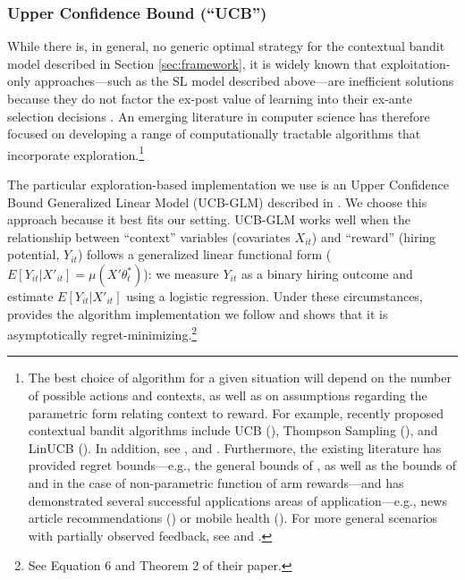 \documentclass[crop,noquery,editorname,historyrev,nosurname,runningno,sepcount]{RESTUD}
\begin{document}
\subsubsection{Upper Confidence Bound (``UCB'')} \label{ucb_details}

While there is, in general, no generic optimal strategy for the contextual bandit model described in Section \ref{sec:framework}, it is widely known that exploitation-only approaches---such as the SL model described above---are inefficient solutions because they do not factor the ex-post value of learning into their ex-ante selection decisions \citep{dimakopoulou_estimation_2018, bastani2019}.   An emerging literature in computer science has therefore focused on developing a range of computationally tractable algorithms that incorporate exploration.\footnote{The best choice of algorithm for a given situation will depend on the number of possible actions and contexts, as well as on assumptions regarding the parametric form relating context to reward.  For example, recently proposed contextual bandit algorithms include UCB (\citet{auer_using_2002}), Thompson Sampling (\citet{agrawal2013}), and LinUCB (\citet{li_contextual-bandit_2010}).  In addition, see \citet{agrawal2013}, and \citet{bastani_online_2019}.  Furthermore, the existing literature has provided regret bounds---e.g., the general bounds of \citet{russo2015informationtheoretic}, as well as the bounds of \citet{rigollet2010nonparametric} and \citet{slivkins_contextual_2014} in the case of non-parametric function of arm rewards---and has demonstrated several successful applications areas of application---e.g., news article recommendations (\citet{li_contextual-bandit_2010}) or mobile health (\citet{lei2017actorcritic}). For more general scenarios with partially observed feedback, see \citet{rejwan2019topk} and \citet{bechavod2020equal}. } 


The particular exploration-based implementation we use is an Upper Confidence Bound Generalized Linear Model (UCB-GLM) described in \citet{li2017}.  We choose this approach because it best fits our setting. UCB-GLM works well when the relationship between ``context'' variables (covariates $X_{it}$) and ``reward'' (hiring potential, $Y_{it}$) follows a generalized linear functional form ($E[Y_{it} | X'_{it}] = \mu(X'\theta_t^*)$): we measure $Y_{it}$ as a binary hiring outcome and estimate $E[Y_{it} | X'_{it}]$ using a logistic regression.  Under these circumstances, \citet{li2017} provides the algorithm implementation we follow and shows that it is asymptotically regret-minimizing.\footnote{See Equation 6 and Theorem 2 of their paper.}
\end{document}
